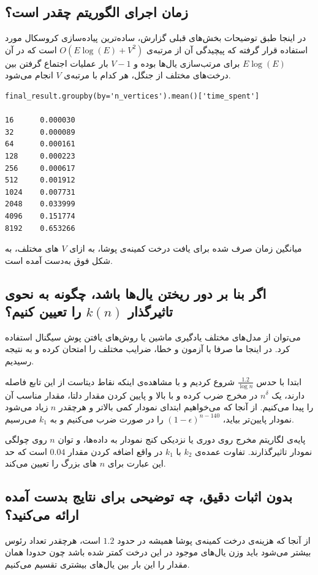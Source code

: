 \documentclass{article}
\begin{document}
\subsection{زمان اجرای الگوریتم چقدر است؟}
در اینجا طبق توضیحات بخش‌های قبلی گزارش، ساده‌ترین پیاده‌سازی کروسکال مورد استفاده قرار گرفته که پیچیدگی آن از مرتبه‌ی
$O(E\log(E)+V^2)$
است که در آن
$E\log(E)$
برای مرتب‌سازی یال‌ها بوده و
$V-1$
بار عملیات اجتماع گرفتن بین درخت‌های مختلف از جنگل، هر کدام با مرتبه‌ی
$V$
انجام می‌شود.

\begin{latin}
\begin{verbatim}
final_result.groupby(by='n_vertices').mean()['time_spent']

16      0.000030
32      0.000089
64      0.000161
128     0.000223
256     0.000617
512     0.001912
1024    0.007731
2048    0.033999
4096    0.151774
8192    0.653266
\end{verbatim}
\end{latin}


میانگین زمان صرف شده برای یافت درخت کمینه‌ی پوشا، به ازای
$V$
های مختلف، به شکل فوق به‌دست آمده است.

\subsection{اگر بنا بر دور ریختن یال‌ها باشد، چگونه به نحوی تاثیرگذار
$k(n)$
را تعیین کنیم؟}
می‌توان از مدل‌های مختلف یادگیری ماشین یا روش‌های یافتن پوش سیگنال استفاده کرد. در اینجا ما صرفا با آزمون و خطا، ضرایب مختلف را امتحان کرده و به نتیجه رسیدیم.

ابتدا با حدس
$\frac{1.2}{\log{n}}$
شروع کردیم و با مشاهده‌ی اینکه نقاط دیتاست از این تابع فاصله دارند، یک
$n^\delta$
در مخرج ضرب کرده و با بالا و پایین کردن مقدار دلتا، مقدار مناسب آن را پیدا می‌کنیم. از آنجا که می‌خواهیم ابتدای نمودار کمی بالاتر و هرچقدر
$n$
زیاد می‌شود نمودار پایین‌تر بیاید،
$(1-\epsilon)^{n-140}$
را در صورت ضرب می‌کنیم و به
$k_1$
می‌رسیم.

پایه‌ی لگاریتم مخرج روی دوری یا نزدیکی کنج نمودار به داده‌ها، و توان
$n$
روی چولگی نمودار تاثیرگذارند. تفاوت عمده‌ی
$k_2$
با
$k_1$
در واقع اضافه کردن مقدار
$0.04$
است که حد این عبارت برای
$n$
های بزرگ را تعیین می‌کند.
\subsection{بدون اثبات دقیق، چه توضیحی برای نتایج بدست آمده ارائه می‌کنید؟}
از آنجا که هزینه‌ی درخت کمینه‌ی پوشا همیشه در حدود
$1.2$
است، هرچقدر تعداد رئوس بیشتر می‌شود باید وزن یال‌های موجود در این درخت کمتر شده باشد چون حدودا همان مقدار را این بار بین یال‌های بیشتری تقسیم می‌کنیم.
\end{document}
